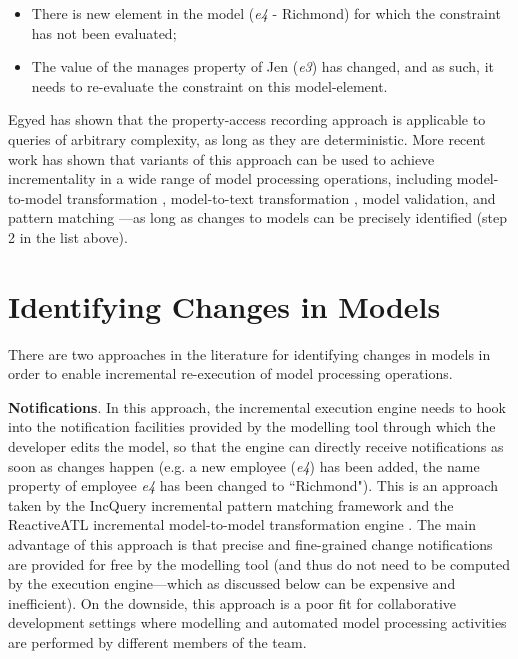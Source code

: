 \begin{itemize}
    \item There is new element in the model (\emph{e4} - Richmond) for which the constraint has not been evaluated;
    \item The value of the manages property of Jen (\emph{e3}) has changed, and as such, it needs to re-evaluate the constraint on this model-element.
\end{itemize}

Egyed has shown that the property-access recording approach is applicable to queries of arbitrary complexity, as long as they are deterministic. More recent work has shown that variants of this approach can be used to achieve incrementality in a wide range of model processing operations, including model-to-model transformation \cite{jouault2010towards}, model-to-text transformation \cite{ogunyomi2015property}, model validation, and pattern matching \cite{rath2012derived}---as long as changes to models can be precisely identified (step 2 in the list above).

\section{Identifying Changes in Models}
\label{sec:identifying_changes_in models}
There are two approaches in the literature for identifying changes in models in order to enable incremental re-execution of model processing operations.

\textbf{Notifications}. In this approach, the incremental execution engine needs to hook into the notification facilities provided by the modelling tool through which the developer edits the model, so that the engine can directly receive notifications as soon as changes happen (e.g. a new employee (\emph{e4}) has been added, the name property of employee \emph{e4} has been changed to ``Richmond"). This is an approach taken by the IncQuery incremental pattern matching framework \cite{rath2012derived} and the ReactiveATL incremental model-to-model transformation engine \cite{ogunyomi2015property}. The main advantage of this approach is that precise and fine-grained change notifications are provided for free by the modelling tool (and thus do not need to be computed by the execution engine---which as discussed below can be expensive and inefficient). On the downside, this approach is a poor fit for collaborative development settings where modelling and automated model processing activities are performed by different members of the team.

